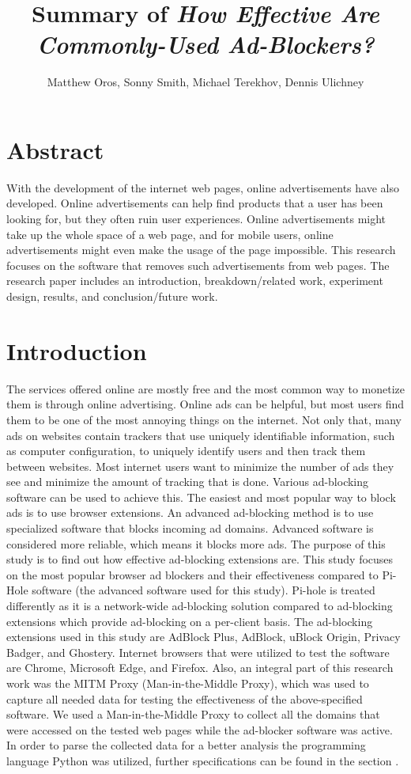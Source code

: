 \documentclass[sigsmall]{acmart}
\title{Summary of \emph{How Effective Are Commonly-Used Ad-Blockers?}}
\author{Matthew Oros, Sonny Smith, Michael Terekhov, Dennis Ulichney}
\begin{document}
\maketitle


\section*{Abstract}
With the development of the internet web pages, online advertisements have also developed. Online advertisements can help find products that a user has been looking for, but they often ruin user experiences. Online advertisements might take up the whole space of a web page, and for mobile users, online advertisements might even make the usage of the page impossible. This research focuses on the software that removes such advertisements from web pages. The research paper includes an introduction, breakdown/related work, experiment design, results, and conclusion/future work.  

\section*{Introduction}
The services offered online are mostly free and the most common way to monetize them is through online advertising. Online ads can be helpful, but most users find them to be one of the most annoying things on the internet. Not only that, many ads on websites contain trackers that use uniquely identifiable information, such as computer configuration, to uniquely identify users and then track them between websites. Most internet users want to minimize the number of ads they see and minimize the amount of tracking that is done. Various ad-blocking software can be used to achieve this. The easiest and most popular way to block ads is to use browser extensions. An advanced ad-blocking method is to use specialized software that blocks incoming ad domains. Advanced software is considered more reliable, which means it blocks more ads. The purpose of this study is to find out how effective ad-blocking extensions are. This study focuses on the most popular browser ad blockers and their effectiveness compared to Pi-Hole software (the advanced software used for this study). Pi-hole is treated differently as it is a network-wide ad-blocking solution compared to ad-blocking extensions which provide ad-blocking on a per-client basis. The ad-blocking extensions used in this study are AdBlock Plus, AdBlock, uBlock Origin, Privacy Badger, and Ghostery. Internet browsers that were utilized to test the software are Chrome, Microsoft Edge, and Firefox. Also, an integral part of this research work was the MITM Proxy (Man-in-the-Middle Proxy), which was used to capture all needed data for testing the effectiveness of the above-specified software. We used a Man-in-the-Middle Proxy to collect all the domains that were accessed on the tested web pages while the ad-blocker software was active. In order to parse the collected data for a better analysis the programming language Python was utilized, further specifications can be found in the section . 
\end{document}
